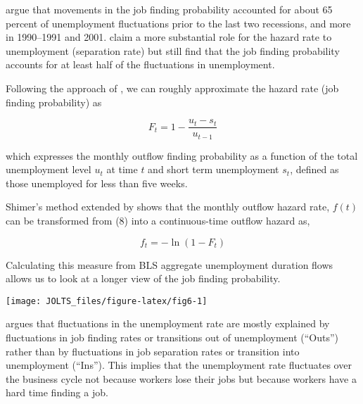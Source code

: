 \documentclass[
  11pt,
]{article}
\numberwithin{equation}{section}
\begin{document}
\cite{elsby09b} argue that movements in the job finding probability
accounted for about 65 percent of unemployment fluctuations prior to the
last two recessions, and more in 1990--1991 and 2001. \cite{fujita09}
claim a more substantial role for the hazard rate to unemployment
(separation rate) but still find that the job finding probability
accounts for at least half of the fluctuations in unemployment.

Following the approach of \cite{Shimer12}, we can roughly approximate
the hazard rate (job finding probability) as

\begin{equation}
F_{t} = 1 - \frac{u_{t} - s_{t}}{u_{t-1}}
\end{equation}

which expresses the monthly outflow finding probability as a function of
the total unemployment level \(u_{t}\) at time \(t\) and short term
unemployment \(s_{t}\), defined as those unemployed for less than five
weeks.

Shimer's method extended by \cite{elsby13} shows that the monthly
outflow hazard rate, \(f(t)\) can be transformed from (8) into a
continuous-time outflow hazard as,

\begin{equation}
f_{t} = - \ln(1 - F_{t})
\end{equation}

Calculating this measure from BLS aggregate unemployment duration flows
allows us to look at a longer view of the job finding probability.

\begin{center}\texttt{[image: JOLTS\_files/figure-latex/fig6-1]} \end{center}

\cite{Shimer12} argues that fluctuations in the unemployment rate are
mostly explained by fluctuations in job finding rates or transitions out
of unemployment (``Outs'') rather than by fluctuations in job separation
rates or transition into unemployment (``Ins''). This implies that the
unemployment rate fluctuates over the business cycle not because workers
lose their jobs but because workers have a hard time finding a job.
\end{document}
